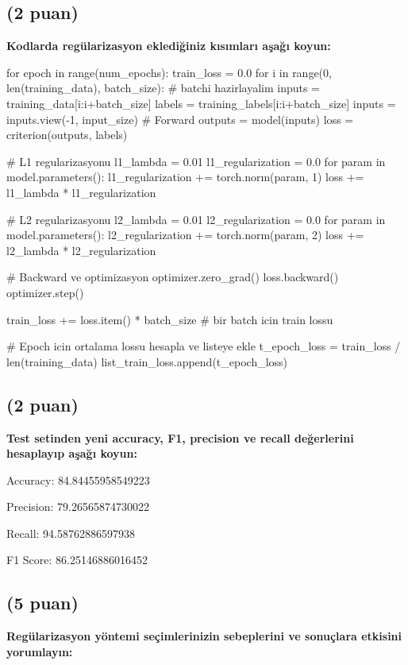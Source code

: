 \documentclass[11pt]{article}
\begin{document}
\subsection{(2 puan)} \textbf{Kodlarda regülarizasyon eklediğiniz kısımları aşağı koyun:} 

\begin{python}
for epoch in range(num_epochs):
    train_loss = 0.0
    for i in range(0, len(training_data), batch_size):
        # batchi hazirlayalim
        inputs = training_data[i:i+batch_size]
        labels = training_labels[i:i+batch_size]
        inputs = inputs.view(-1, input_size)
        # Forward 
        outputs = model(inputs)
        loss = criterion(outputs, labels)
        
        # L1 regularizasyonu
        l1_lambda = 0.01
        l1_regularization = 0.0
        for param in model.parameters():
            l1_regularization += torch.norm(param, 1)
        loss += l1_lambda * l1_regularization

        # L2 regularizasyonu
        l2_lambda = 0.01
        l2_regularization = 0.0
        for param in model.parameters():
            l2_regularization += torch.norm(param, 2)
        loss += l2_lambda * l2_regularization
        
        # Backward ve optimizasyon
        optimizer.zero_grad()
        loss.backward()
        optimizer.step()
        
        train_loss += loss.item() * batch_size # bir batch icin train lossu
        
    # Epoch icin ortalama lossu hesapla ve listeye ekle 
    t_epoch_loss = train_loss / len(training_data) 
    list_train_loss.append(t_epoch_loss)
\end{python}

\subsection{(2 puan)} \textbf{Test setinden yeni accuracy, F1, precision ve recall değerlerini hesaplayıp aşağı koyun:}

Accuracy: 84.84455958549223

Precision: 79.26565874730022

Recall: 94.58762886597938

F1 Score: 86.25146886016452
\subsection{(5 puan)} \textbf{Regülarizasyon yöntemi seçimlerinizin sebeplerini ve sonuçlara etkisini yorumlayın:}
\end{document}
